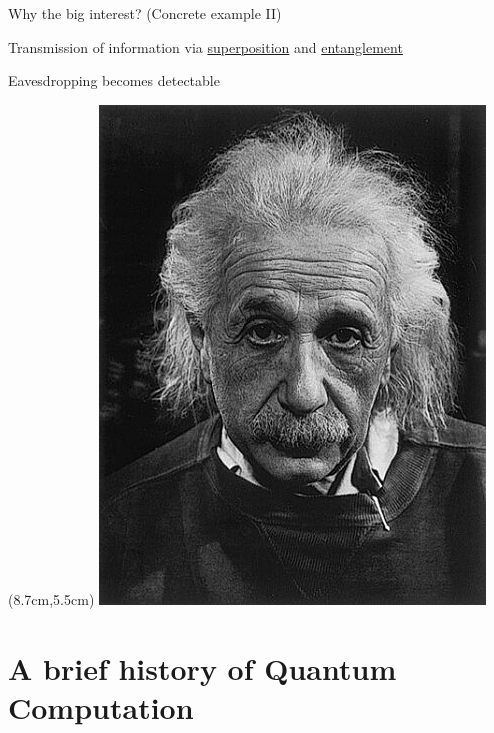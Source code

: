 \documentclass{beamer}
\begin{document}
\begin{frame}{Why the big interest? (Concrete example II)}

  Transmission of information via \alert{\underline{superposition}} and
  \alert{\underline{entanglement}}


  Eavesdropping becomes detectable 
  \vfill
  \begin{textblock*}{3.5cm}(8.7cm,5.5cm)
    \includegraphics[scale=0.20]{images/einstein.jpg}
  \end{textblock*}

\end{frame}

\section{A brief history of Quantum Computation}
\end{document}
